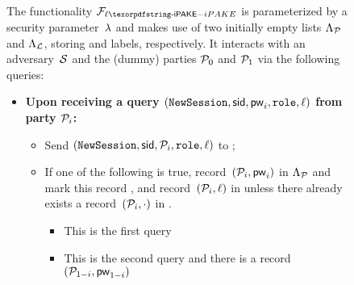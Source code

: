 

\begin{figure}[htbp]
\centering
\begin{fboxenv}
\begin{minipage}{0.95\textwidth}
	The functionality $\FliPAKE$ is parameterized by a security parameter~$\lambda$ and makes use of two initially empty lists $\Lambda_{\mathcal{P}}$ and $\Lambda_{\mathcal{L}}$, storing \passwords and labels, respectively.
It interacts with an adversary~$\mathcal{S}$ and the (dummy) parties $\mathcal{P}_{0}$ and $\mathcal{P}_{1}$ via the following queries:\\[-1.8em]
\begin{itemize}
	\item
		\textbf{Upon receiving a query
			$(\texttt{NewSession},\mathsf{sid},\mathsf{pw}_{i},\texttt{role},\ell)$ from party $\mathcal{P}_{i}$:}
		\begin{itemize}
			\item Send $(\texttt{NewSession},\mathsf{sid},\mathcal{P}_{i},\texttt{role},\ell)$ to \Sim;
			\item If one of the following is true, 
			record~$(\mathcal{P}_{i},\mathsf{pw}_{i})$ in $\Lambda_{\mathcal{P}}$ and mark this record , and
			record~$(\mathcal{P}_{i},\ell)$ in \Ll unless there already exists a record~$(\mathcal{P}_{i},\cdot)$ in \Ll.
			\begin{itemize}
				\item This is the first \NewSession query %
				\item This is the second \NewSession query %
				and there is a record~$(\mathcal{P}_{1-i},\mathsf{pw}_{1-i})$
			\end{itemize}

\end{itemize}
\end{itemize}
\end{minipage}
\end{fboxenv}
\end{figure}
